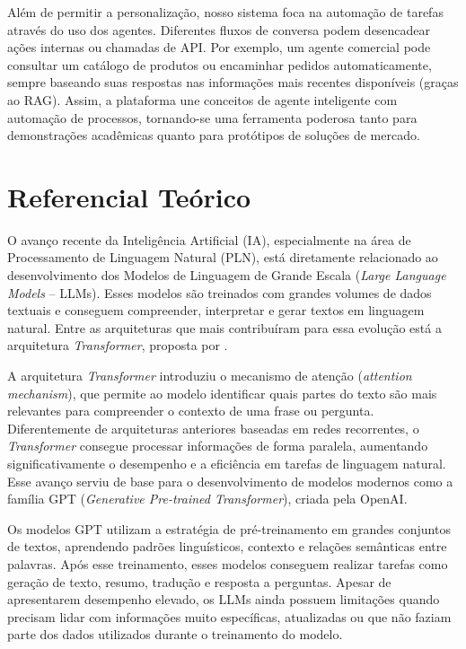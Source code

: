 \documentclass[12pt, openright, oneside, a4paper, brazil]{ads-unipac-abntex2}
\begin{document}
Além de permitir a personalização, nosso sistema foca na automação de tarefas através do uso dos agentes. Diferentes fluxos de conversa podem desencadear ações internas ou chamadas de API. Por exemplo, um agente comercial pode consultar um catálogo de produtos ou encaminhar pedidos automaticamente, sempre baseando suas respostas nas informações mais recentes disponíveis (graças ao RAG). Assim, a plataforma une conceitos de agente inteligente com automação de processos, tornando-se uma ferramenta poderosa tanto para demonstrações acadêmicas quanto para protótipos de soluções de mercado.

\chapter[Referencial Teórico]{Referencial Teórico}
O avanço recente da Inteligência Artificial (IA), especialmente na área de Processamento de Linguagem Natural (PLN), está diretamente relacionado ao desenvolvimento dos Modelos de Linguagem de Grande Escala (\textit{Large Language Models} -- LLMs). Esses modelos são treinados com grandes volumes de dados textuais e conseguem compreender, interpretar e gerar textos em linguagem natural. Entre as arquiteturas que mais contribuíram para essa evolução está a arquitetura \textit{Transformer}, proposta por .

A arquitetura \textit{Transformer} introduziu o mecanismo de atenção (\textit{attention mechanism}), que permite ao modelo identificar quais partes do texto são mais relevantes para compreender o contexto de uma frase ou pergunta. Diferentemente de arquiteturas anteriores baseadas em redes recorrentes, o \textit{Transformer} consegue processar informações de forma paralela, aumentando significativamente o desempenho e a eficiência em tarefas de linguagem natural. Esse avanço serviu de base para o desenvolvimento de modelos modernos como a família GPT (\textit{Generative Pre-trained Transformer}), criada pela OpenAI.

Os modelos GPT utilizam a estratégia de pré-treinamento em grandes conjuntos de textos, aprendendo padrões linguísticos, contexto e relações semânticas entre palavras. Após esse treinamento, esses modelos conseguem realizar tarefas como geração de texto, resumo, tradução e resposta a perguntas. Apesar de apresentarem desempenho elevado, os LLMs ainda possuem limitações quando precisam lidar com informações muito específicas, atualizadas ou que não faziam parte dos dados utilizados durante o treinamento do modelo.
\end{document}
